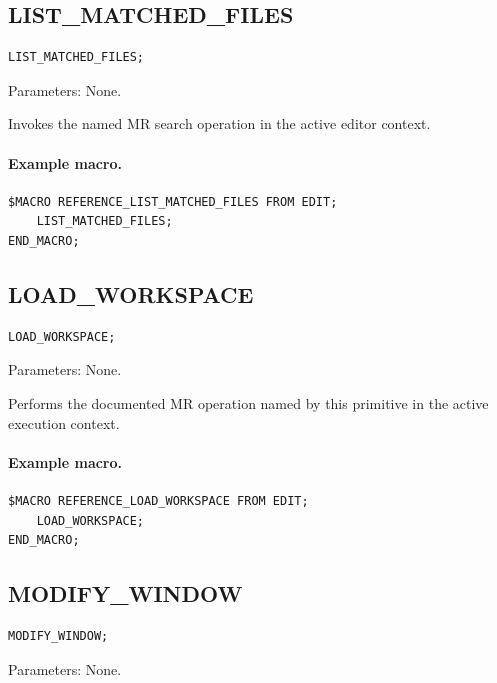 \documentclass[a4paper,10pt,twoside,openany]{book}
\newenvironment{mrmacextension}{\begin{changebar}}{\end{changebar}}
\begin{document}
\begin{mrmacextension}
\label{prim:procedure-list-matched-files}
\subsection*{LIST\_MATCHED\_FILES}
\begin{verbatim}
LIST_MATCHED_FILES;
\end{verbatim}
Parameters: None.

Invokes the named MR search operation in the active editor context.

\paragraph{Example macro.}
\begin{verbatim}
$MACRO REFERENCE_LIST_MATCHED_FILES FROM EDIT;
    LIST_MATCHED_FILES;
END_MACRO;
\end{verbatim}
\end{mrmacextension}

\begin{mrmacextension}
\label{prim:procedure-load-workspace}
\subsection*{LOAD\_WORKSPACE}
\begin{verbatim}
LOAD_WORKSPACE;
\end{verbatim}
Parameters: None.

Performs the documented MR operation named by this primitive in the active execution context.

\paragraph{Example macro.}
\begin{verbatim}
$MACRO REFERENCE_LOAD_WORKSPACE FROM EDIT;
    LOAD_WORKSPACE;
END_MACRO;
\end{verbatim}
\end{mrmacextension}

\label{prim:procedure-modify-window}
\subsection*{MODIFY\_WINDOW}
\begin{verbatim}
MODIFY_WINDOW;
\end{verbatim}
Parameters: None.
\end{document}
